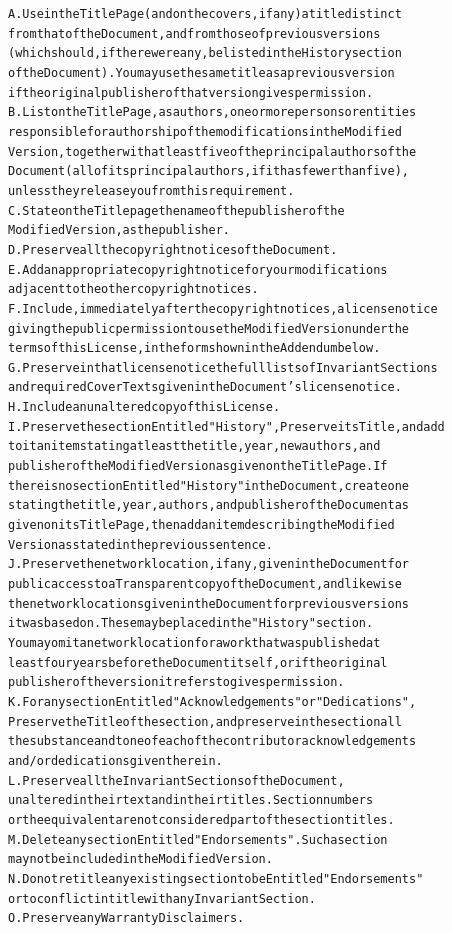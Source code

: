 \documentclass[DIV=12,%
               BCOR=0mm,%
               fontsize=10pt,%
               oneside,%
               paper=210mm:11in]{scrbook}
\begin{document}
\begin{alltt}
A. Use in the Title Page (and on the covers, if any) a title distinct
   from that of the Document, and from those of previous versions
   (which should, if there were any, be listed in the History section
   of the Document).  You may use the same title as a previous version
   if the original publisher of that version gives permission.
B. List on the Title Page, as authors, one or more persons or entities
   responsible for authorship of the modifications in the Modified
   Version, together with at least five of the principal authors of the
   Document (all of its principal authors, if it has fewer than five),
   unless they release you from this requirement.
C. State on the Title page the name of the publisher of the
   Modified Version, as the publisher.
D. Preserve all the copyright notices of the Document.
E. Add an appropriate copyright notice for your modifications
   adjacent to the other copyright notices.
F. Include, immediately after the copyright notices, a license notice
   giving the public permission to use the Modified Version under the
   terms of this License, in the form shown in the Addendum below.
G. Preserve in that license notice the full lists of Invariant Sections
   and required Cover Texts given in the Document's license notice.
H. Include an unaltered copy of this License.
I. Preserve the section Entitled "History", Preserve its Title, and add
   to it an item stating at least the title, year, new authors, and
   publisher of the Modified Version as given on the Title Page.  If
   there is no section Entitled "History" in the Document, create one
   stating the title, year, authors, and publisher of the Document as
   given on its Title Page, then add an item describing the Modified
   Version as stated in the previous sentence.
J. Preserve the network location, if any, given in the Document for
   public access to a Transparent copy of the Document, and likewise
   the network locations given in the Document for previous versions
   it was based on.  These may be placed in the "History" section.
   You may omit a network location for a work that was published at
   least four years before the Document itself, or if the original
   publisher of the version it refers to gives permission.
K. For any section Entitled "Acknowledgements" or "Dedications",
   Preserve the Title of the section, and preserve in the section all
   the substance and tone of each of the contributor acknowledgements
   and/or dedications given therein.
L. Preserve all the Invariant Sections of the Document,
   unaltered in their text and in their titles.  Section numbers
   or the equivalent are not considered part of the section titles.
M. Delete any section Entitled "Endorsements".  Such a section
   may not be included in the Modified Version.
N. Do not retitle any existing section to be Entitled "Endorsements"
   or to conflict in title with any Invariant Section.
O. Preserve any Warranty Disclaimers.


\end{alltt}
\end{document}
